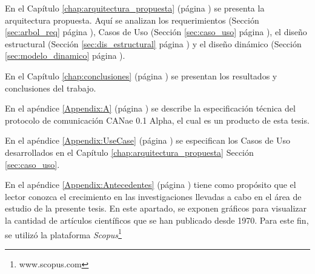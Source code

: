En el Capítulo \ref{chap:arquitectura_propuesta} (página \pageref{chap:arquitectura_propuesta}) se
presenta la arquitectura propuesta. Aquí se  analizan los
requerimientos (Sección \ref{sec:arbol_req} página \pageref{sec:arbol_req}), Casos de Uso
(Sección \ref{sec:caso_uso} página \pageref{sec:caso_uso}), el diseño estructural
(Sección \ref{sec:dis_estructural} página \pageref{sec:dis_estructural}) y el diseño dinámico
(Sección \ref{sec:modelo_dinamico} página \pageref{sec:modelo_dinamico}).

En el Capítulo \ref{chap:conclusiones} (página \pageref{chap:conclusiones}) se presentan
los resultados y conclusiones del trabajo.

En el apéndice \ref{Appendix:A} (página \pageref{Appendix:A}) se describe la especificación
técnica del protocolo de comunicación CANae 0.1 Alpha, el cual es un producto de esta tesis.

En el apéndice \ref{Appendix:UseCase} (página \pageref{Appendix:UseCase}) se especifican los Casos
de Uso desarrollados en el Capítulo \ref{chap:arquitectura_propuesta} Sección \ref{sec:caso_uso}.

En el apéndice \ref{Appendix:Antecedentes} (página \pageref{Appendix:Antecedentes}) tiene como propósito que el lector conozca
el crecimiento en las investigaciones llevadas a cabo en el área de estudio de
la presente tesis. En este apartado, se exponen gráficos para visualizar la cantidad de 
artículos científicos que se han publicado desde 1970. Para este fin, se utilizó la
plataforma \textit{Scopus}\footnote{www.scopus.com}

